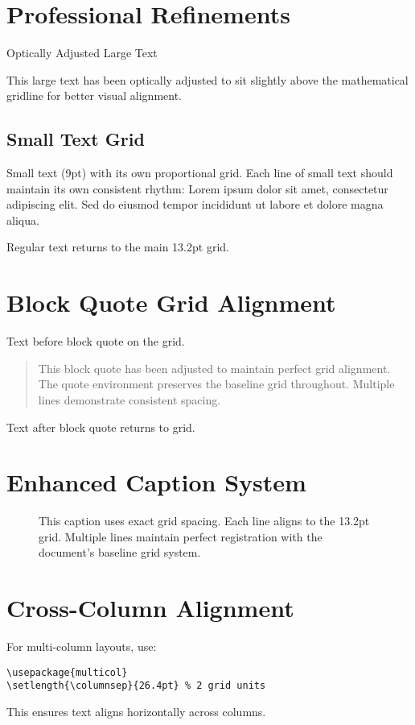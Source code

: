 \documentclass[11pt]{article}
\newcommand{\alignToThirdGrid}[1]{%
  \vspace*{\dimexpr 39.6pt - \baselineskip - \ht\strutbox\relax}%
  #1%
}
\begin{document}
\section{Professional Refinements}

{\Large\alignToThirdGrid{Optically Adjusted Large Text}}

This large text has been optically adjusted to sit slightly above the mathematical gridline for better visual alignment.

\subsection{Small Text Grid}

{\footnotesize
Small text (9pt) with its own proportional grid. Each line of small text should maintain its own consistent rhythm: Lorem ipsum dolor sit amet, consectetur adipiscing elit. Sed do eiusmod tempor incididunt ut labore et dolore magna aliqua.
}

Regular text returns to the main 13.2pt grid.

\section{Block Quote Grid Alignment}

Text before block quote on the grid.

\begin{quote}
\setlength{\parskip}{0pt}
This block quote has been adjusted to maintain perfect grid alignment. The quote environment preserves the baseline grid throughout. Multiple lines demonstrate consistent spacing.
\end{quote}

Text after block quote returns to grid.

\section{Enhanced Caption System}

\begin{figure}[h!]
\centering
{}
\vspace{-\parskip}
\caption[Short caption]{\setlength{\baselineskip}{13.2pt}%
This caption uses exact grid spacing. Each line aligns to the 13.2pt grid. Multiple lines maintain perfect registration with the document's baseline grid system.}
\end{figure}

\section{Cross-Column Alignment}

For multi-column layouts, use:

\begin{verbatim}
\usepackage{multicol}
\setlength{\columnsep}{26.4pt} % 2 grid units
\end{verbatim}

This ensures text aligns horizontally across columns.
\end{document}

